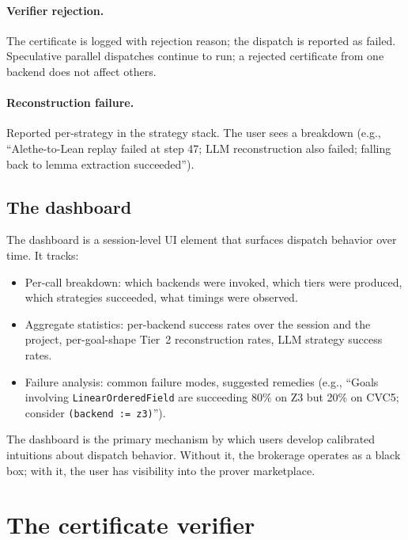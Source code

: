 \documentclass[11pt,letterpaper]{article}
\theoremstyle{definition}
\theoremstyle{remark}
\begin{document}
\paragraph{Verifier rejection.} The certificate is logged with
rejection reason; the dispatch is reported as failed. Speculative
parallel dispatches continue to run; a rejected certificate from one
backend does not affect others.

\paragraph{Reconstruction failure.} Reported per-strategy in the
strategy stack. The user sees a breakdown (e.g., ``Alethe-to-Lean
replay failed at step 47; LLM reconstruction also failed; falling
back to lemma extraction succeeded'').

\subsection{The dashboard}

The dashboard is a session-level UI element that surfaces dispatch
behavior over time. It tracks:

\begin{itemize}[leftmargin=2em]
  \item Per-call breakdown: which backends were invoked, which tiers
        were produced, which strategies succeeded, what timings were
        observed.
  \item Aggregate statistics: per-backend success rates over the
        session and the project, per-goal-shape Tier~2 reconstruction
        rates, LLM strategy success rates.
  \item Failure analysis: common failure modes, suggested remedies
        (e.g., ``Goals involving \texttt{LinearOrderedField} are
        succeeding 80\% on Z3 but 20\% on CVC5; consider
        \texttt{(backend := z3)}'').
\end{itemize}

The dashboard is the primary mechanism by which users develop
calibrated intuitions about dispatch behavior. Without it, the
brokerage operates as a black box; with it, the user has visibility
into the prover marketplace.

\section{The certificate verifier}
\label{sec:verifier}
\end{document}
